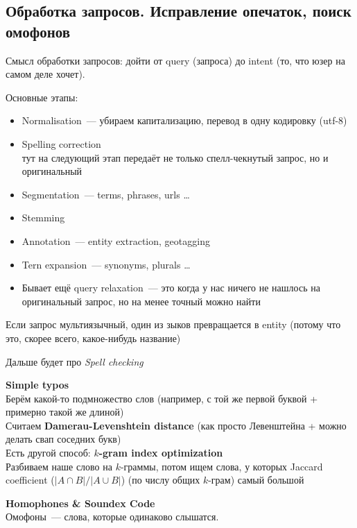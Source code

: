 \documentclass[12pt]{article}
\begin{document}
  \subsection{Обработка запросов. Исправление опечаток, поиск омофонов}
    Смысл обработки запросов: дойти от query (запроса) до intent (то, что юзер на самом деле хочет).

    \smallskip\smallskip
    Основные этапы:
      \begin{itemize}
          \item Normalisation~--- убираем капитализацию, перевод в одну кодировку (utf-8)
          \item Spelling correction\\
          тут на следующий этап передаёт не только спелл-чекнутый запрос, но и оригинальный
          \item Segmentation~--- terms, phrases, urls \dots
          \item Stemming
          \item Annotation~--- entity extraction, geotagging
          \item Tern expansion~--- synonyms, plurals \dots
          \item Бывает ещё query relaxation~--- это когда у нас ничего не нашлось на оригинальный запрос, но на менее точный можно найти
      \end{itemize}
      Если запрос мультиязычный, один из зыков превращается в entity (потому что это, скорее всего, какое-нибудь название)

      \smallskip\smallskip
      Дальше будет про \textit{Spell checking}

      \smallskip\smallskip
      {\bf Simple typos}\\
        Берём какой-то подмножество слов (например, с той же первой буквой + примерно такой же длиной)\\
        Считаем {\bf Damerau-Levenshtein distance} (как просто Левенштейна + можно делать свап соседних букв)\\
        Есть другой способ: {\bf $k$-gram index optimization}\\
        Разбиваем наше слово на $k$-граммы, потом ищем слова, у которых Jaccard coefficient ($|A \cap B| / |A \cup B|$) (по числу общих $k$-грам) самый большой

      \smallskip\smallskip
      {\bf Homophones \& Soundex Code}\\
        Омофоны~--- слова, которые одинаково слышатся.
\end{document}
